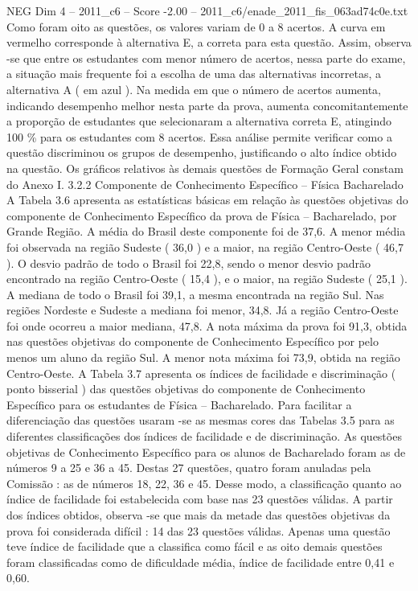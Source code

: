 \begin{textsample}{NEG Dim 4 – 2011\_c6 – Score -2.00 – 2011\_c6/enade\_2011\_fis\_063ad74c0e.txt}
Como foram oito as questões, os valores variam de 0 a 8 acertos.
A curva em vermelho corresponde à alternativa E, a correta para esta questão.
Assim, observa -se que entre os estudantes com menor número de acertos, nessa parte do exame, a situação mais frequente foi a escolha de uma das alternativas incorretas, a alternativa A ( em azul ).
Na medida em que o número de acertos aumenta, indicando desempenho melhor nesta parte da prova, aumenta concomitantemente a proporção de estudantes que selecionaram a alternativa correta E, atingindo 100 \% para os estudantes com 8 acertos.
Essa análise permite verificar como a questão discriminou os grupos de desempenho, justificando o alto índice obtido na questão.
Os gráficos relativos às demais questões de Formação Geral constam do Anexo I. 3.2.2 Componente de Conhecimento Específico – Física Bacharelado A Tabela 3.6 apresenta as estatísticas básicas em relação às questões objetivas do componente de Conhecimento Específico da prova de Física – Bacharelado, por Grande Região.
A média do Brasil deste componente foi de 37,6.
A menor média foi observada na região Sudeste ( 36,0 ) e a maior, na região Centro-Oeste ( 46,7 ).
O desvio padrão de todo o Brasil foi 22,8, sendo o menor desvio padrão encontrado na região Centro-Oeste ( 15,4 ), e o maior, na região Sudeste ( 25,1 ).
A mediana de todo o Brasil foi 39,1, a mesma encontrada na região Sul.
Nas regiões Nordeste e Sudeste a mediana foi menor, 34,8.
Já a região Centro-Oeste foi onde ocorreu a maior mediana, 47,8.
A nota máxima da prova foi 91,3, obtida nas questões objetivas do componente de Conhecimento Específico por pelo menos um aluno da região Sul.
A menor nota máxima foi 73,9, obtida na região Centro-Oeste.
A Tabela 3.7 apresenta os índices de facilidade e discriminação ( ponto bisserial ) das questões objetivas do componente de Conhecimento Específico para os estudantes de Física – Bacharelado.
Para facilitar a diferenciação das questões usaram -se as mesmas cores das Tabelas 3.5 para as diferentes classificações dos índices de facilidade e de discriminação.
As questões objetivas de Conhecimento Específico para os alunos de Bacharelado foram as de números 9 a 25 e 36 a 45.
Destas 27 questões, quatro foram anuladas pela Comissão : as de números 18, 22, 36 e 45.
Desse modo, a classificação quanto ao índice de facilidade foi estabelecida com base nas 23 questões válidas.
A partir dos índices obtidos, observa -se que mais da metade das questões objetivas da prova foi considerada difícil : 14 das 23 questões válidas.
Apenas uma questão teve índice de facilidade que a classifica como fácil e as oito demais questões foram classificadas como de dificuldade média, índice de facilidade entre 0,41 e 0,60.

\end{textsample}
